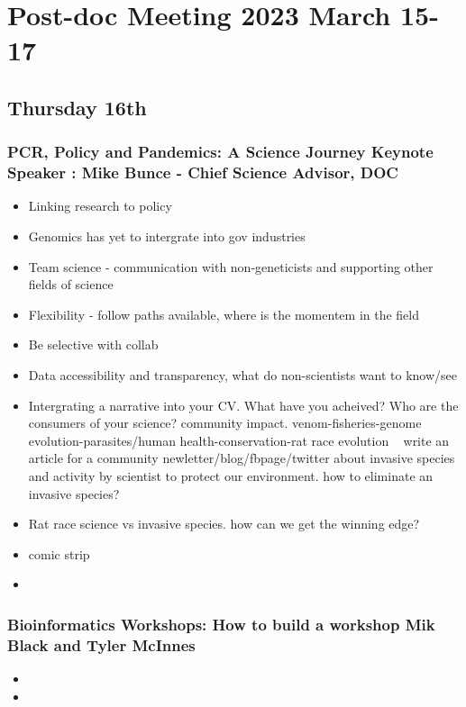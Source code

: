 \documentclass[document.tex]{subfiles}
\begin{document}
\chapter{Post-doc Meeting 2023 March 15-17}
\label{day:2023-03-15}

\section*{Thursday 16th}

    \subsection{PCR, Policy and Pandemics: A Science Journey
    Keynote Speaker : Mike Bunce - Chief Science Advisor, DOC}
    \begin{itemize}
    \item Linking research to policy 
    \item Genomics has yet to intergrate into gov industries 
    \item Team science - communication with non-geneticists and supporting other fields of science
    \item Flexibility - follow paths available, where is the momentem in the field  
    \item Be selective with collab
    \item Data accessibility and transparency, what do non-scientists want to know/see 
    \item Intergrating a narrative into your CV. What have you acheived? Who are the consumers of your science? community impact. venom-fisheries-genome evolution-parasites/human health-conservation-rat race evolution ~ write an article for a community newletter/blog/fbpage/twitter about invasive species and activity by scientist to protect our environment. how to eliminate an invasive species?  
    \item Rat race science vs invasive species. how can we get the winning edge?
    \item comic strip 
    \item 
    \end{itemize}

    \subsection{Bioinformatics Workshops: How to build a workshop Mik Black and Tyler McInnes}
    \begin{itemize}
    \item 
    \item 
    \end{itemize}
\end{document}
